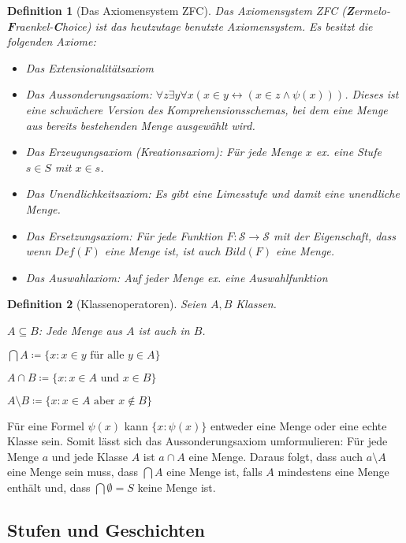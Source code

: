 \documentclass[german]{article}
\theoremstyle{break}
\theoremstyle{def_style}
\newtheorem{definition}{Definition}[section]
\theoremstyle{def_style}
\theoremstyle{lemma_style}
\begin{document}
\begin{definition}[Das Axiomensystem ZFC]
	Das Axiomensystem ZFC (\textbf{Z}ermelo-\textbf{F}raenkel-\textbf{C}hoice) ist das heutzutage benutzte Axiomensystem. Es besitzt die folgenden Axiome:
	\begin{itemize}
		\item Das Extensionalitätsaxiom
		\item Das Aussonderungsaxiom: $\forall z \exists y \forall x (x\in y \leftrightarrow(x\in z \land \psi(x)))$. Dieses ist eine schwächere Version des Komprehensionsschemas, bei dem eine Menge aus bereits bestehenden Menge ausgewählt wird.
		\item Das Erzeugungsaxiom (Kreationsaxiom): Für jede Menge $x$ ex. eine \textit{Stufe} $s\in S$ mit $x\in s$.
		\item Das Unendlichkeitsaxiom: Es gibt eine \textit{Limesstufe} und damit eine unendliche Menge.
		\item Das Ersetzungsaxiom: Für jede Funktion $F:\mathcal{S}\to \mathcal{S}$ mit der Eigenschaft, dass wenn $Def(F)$ eine Menge ist, ist auch $Bild(F)$ eine Menge.
		\item Das Auswahlaxiom: Auf jeder Menge ex. eine \textit{Auswahlfunktion}
	\end{itemize}
\end{definition}

\begin{definition}[Klassenoperatoren]
	Seien $A, B$ Klassen.
	
	$A \subseteq B$: Jede Menge aus $A$ ist auch in $B$.
	
	$\bigcap A\coloneqq\{x : x\in y \text{ für alle } y \in A\}$
	
	$A \cap B \coloneqq \{x : x\in A \text{ und } x \in B\}$
	
	$A \setminus B \coloneqq \{x : x \in A \text{ aber } x \notin B\}$
\end{definition}

Für eine Formel $\psi(x)$ kann $\{x : \psi(x)\}$ entweder eine Menge oder eine echte Klasse sein. Somit lässt sich das Aussonderungsaxiom umformulieren: Für jede Menge $a$ und jede Klasse $A$ ist $a \cap A$ eine Menge. Daraus folgt, dass auch $a \setminus A$ eine Menge sein muss, dass $\bigcap A$ eine Menge ist, falls $A$ mindestens eine Menge enthält und, dass $\bigcap \emptyset = S$ keine Menge ist.

\subsection{Stufen und Geschichten}
\end{document}
